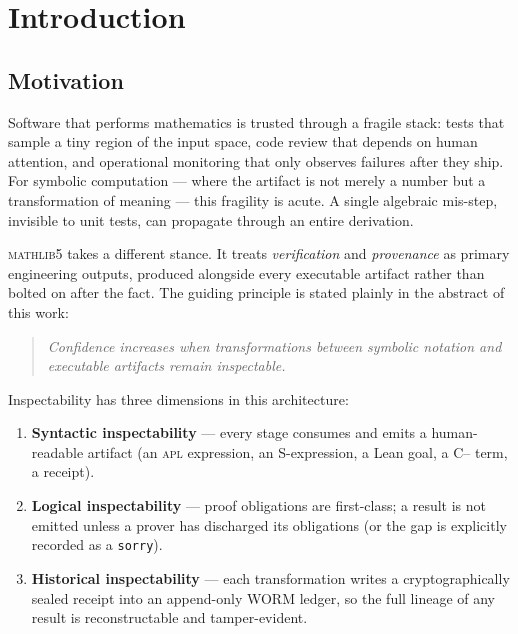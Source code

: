 \chapter{Introduction}
\label{ch:intro}

\section{Motivation}
\label{sec:intro-motivation}

Software that performs mathematics is trusted through a fragile stack: tests
that sample a tiny region of the input space, code review that depends on
human attention, and operational monitoring that only observes failures after
they ship. For symbolic computation --- where the artifact is not merely a
number but a transformation of meaning --- this fragility is acute. A single
algebraic mis-step, invisible to unit tests, can propagate through an entire
derivation.

\textsc{mathlib5} takes a different stance. It treats \emph{verification} and
\emph{provenance} as primary engineering outputs, produced alongside every
executable artifact rather than bolted on after the fact. The guiding
principle is stated plainly in the abstract of this work:

\begin{quote}
\itshape Confidence increases when transformations between symbolic notation
and executable artifacts remain inspectable.
\end{quote}

Inspectability has three dimensions in this architecture:
\begin{enumerate}[label=(\roman*)]
  \item \textbf{Syntactic inspectability} --- every stage consumes and emits a
        human-readable artifact (an \textsc{apl} expression, an S-expression,
        a Lean goal, a C{--} term, a receipt).
  \item \textbf{Logical inspectability} --- proof obligations are first-class;
        a result is not emitted unless a prover has discharged its
        obligations (or the gap is explicitly recorded as a \texttt{sorry}).
  \item \textbf{Historical inspectability} --- each transformation writes a
        cryptographically sealed receipt into an append-only WORM ledger, so
        the full lineage of any result is reconstructable and tamper-evident.
\end{enumerate}

